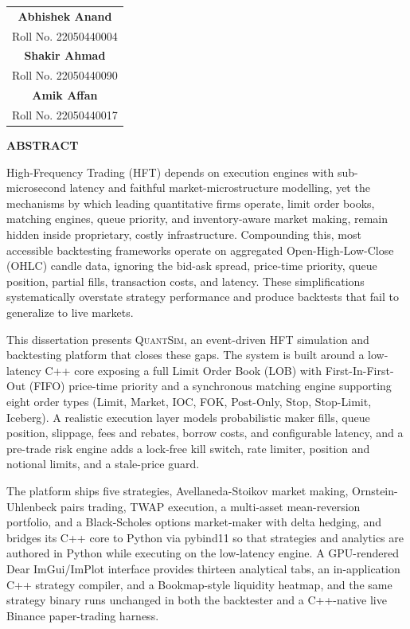 \documentclass[12pt,oneside,a4paper]{report}
\newcommand{\quantsim}{\textsc{QuantSim}}
\begin{document}
\vspace{0.8in}

\begin{flushright}
\begin{tabular}{c}
\textbf{Abhishek Anand} \\
Roll No. 22050440004 \\[10pt]
\textbf{Shakir Ahmad} \\
Roll No. 22050440090 \\[10pt]
\textbf{Amik Affan} \\
Roll No. 22050440017
\end{tabular}
\end{flushright}

\clearpage
\begin{center}
{\Large\bfseries ABSTRACT}
\end{center}
\vspace{0.2in}

High-Frequency Trading (HFT) depends on execution engines with sub-microsecond latency and faithful market-microstructure modelling, yet the mechanisms by which leading quantitative firms operate, limit order books, matching engines, queue priority, and inventory-aware market making, remain hidden inside proprietary, costly infrastructure. Compounding this, most accessible backtesting frameworks operate on aggregated Open-High-Low-Close (OHLC) candle data, ignoring the bid-ask spread, price-time priority, queue position, partial fills, transaction costs, and latency. These simplifications systematically overstate strategy performance and produce backtests that fail to generalize to live markets.

This dissertation presents \quantsim{}, an event-driven HFT simulation and backtesting platform that closes these gaps. The system is built around a low-latency C++ core exposing a full Limit Order Book (LOB) with First-In-First-Out (FIFO) price-time priority and a synchronous matching engine supporting eight order types (Limit, Market, IOC, FOK, Post-Only, Stop, Stop-Limit, Iceberg). A realistic execution layer models probabilistic maker fills, queue position, slippage, fees and rebates, borrow costs, and configurable latency, and a pre-trade risk engine adds a lock-free kill switch, rate limiter, position and notional limits, and a stale-price guard.

The platform ships five strategies, Avellaneda-Stoikov market making, Ornstein-Uhlenbeck pairs trading, TWAP execution, a multi-asset mean-reversion portfolio, and a Black-Scholes options market-maker with delta hedging, and bridges its C++ core to Python via pybind11 so that strategies and analytics are authored in Python while executing on the low-latency engine. A GPU-rendered Dear ImGui/ImPlot interface provides thirteen analytical tabs, an in-application C++ strategy compiler, and a Bookmap-style liquidity heatmap, and the same strategy binary runs unchanged in both the backtester and a C++-native live Binance paper-trading harness.
\end{document}
